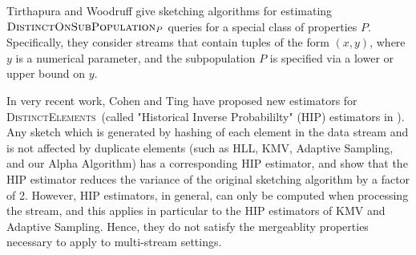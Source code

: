 \documentclass{article}
\newcommand{\distinctsub}{\textsc{DistinctOnSubPopulation}}
\newcommand{\DistinctElements}{\textsc{DistinctElements}}
\begin{document}
Tirthapura and Woodruff \cite{finalcite} give sketching algorithms for estimating $\distinctsub_P$ queries
for a special class of properties $P$. Specifically, they consider streams that contain tuples of the form $(x,y)$, where $y$
is a numerical parameter, and the subpopulation $P$ is specified via a lower or upper bound on $y$. 

In very recent work, Cohen \cite{cohennew} and Ting \cite{ting} have proposed new estimators for \DistinctElements\ (called "Historical Inverse Probabililty" (HIP) estimators in \cite{cohennew}).
Any sketch which is generated by hashing of each element in the data stream and
is not affected by duplicate elements (such as HLL, KMV, Adaptive Sampling, and our Alpha Algorithm) has a corresponding HIP estimator, and \cite{cohennew, ting} show that the HIP estimator reduces the
variance of the original sketching algorithm by a factor of 2. However, HIP estimators, in general, can only be computed when processing the stream, and this applies
in particular to the HIP estimators of KMV and Adaptive Sampling. Hence, they do not satisfy the mergeablity properties necessary to apply to multi-stream settings. 
\end{document}

